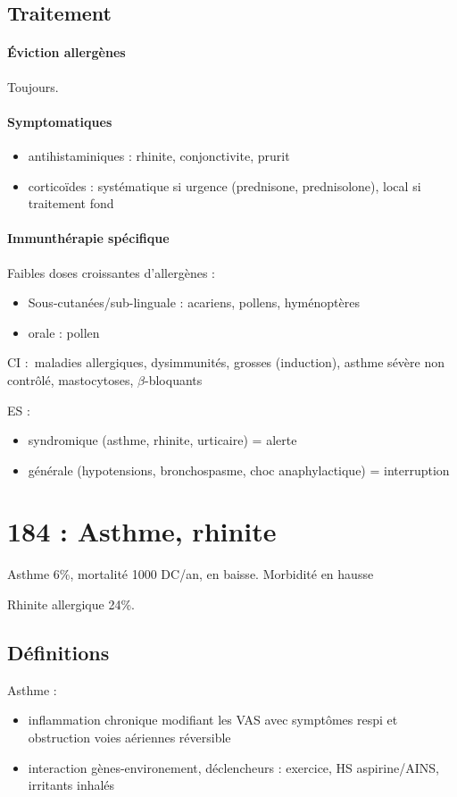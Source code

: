 \documentclass{article}
\begin{document}
\subsection{Traitement}
\paragraph{Éviction allergènes} Toujours.

\paragraph{Symptomatiques}
\begin{itemize}
\item antihistaminiques : rhinite, conjonctivite, prurit
\item corticoïdes : systématique si urgence (prednisone, prednisolone), local
  si traitement fond
\end{itemize}

\paragraph{Immunthérapie spécifique}
Faibles doses croissantes d'allergènes :
\begin{itemize}
\item Sous-cutanées/sub-linguale : acariens, pollens, hyménoptères
\item orale : pollen
\end{itemize}
CI : maladies allergiques, dysimmunités, grosses (induction), asthme sévère non
contrôlé, mastocytoses, $\beta$-bloquants

ES : 
\begin{itemize}
\item syndromique (asthme, rhinite, urticaire) = alerte
\item générale (hypotensions, bronchospasme, choc anaphylactique) =
  interruption
\end{itemize}


\section{184 : Asthme, rhinite}
Asthme 6\%, mortalité 1000 DC/an, en baisse. Morbidité en hausse

Rhinite allergique 24\%.
\subsection{Définitions}
Asthme : 
\begin{itemize}
\item inflammation chronique modifiant les VAS avec symptômes respi et obstruction voies aériennes réversible
\item interaction gènes-environement, déclencheurs : exercice, HS aspirine/AINS,
  irritants inhalés
\end{itemize}
\end{document}
